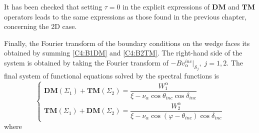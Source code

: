 It has been checked that setting $\tau=0$ in the explicit expressions of $\mathbf{DM}$ and $\mathbf{TM}$ operators leads to the same expressions as those found in the previous chapter, concerning the 2D case.

Finally, the Fourier transform of the boundary conditions on the wedge faces its obtained by summing \eqref{C4:B1DM} and \eqref{C4:B2TM}. The right-hand side of the system is obtained by taking the Fourier transform of $-Bv_{\alpha}^{inc}|_{\mathcal{S}_j}, \; j=1,2$. The final system of functional equations solved by the spectral functions is 
\begin{equation}
\left\{
\begin{matrix}
\textbf{DM}(\Sigma_1)+\textbf{TM}(\Sigma_2)=\dfrac{W_1^{\alpha}}{\xi-\nu_{\alpha} \cos \theta_{inc}\cos\delta_{inc}} 
\\
\textbf{TM}(\Sigma_1)+\textbf{DM}(\Sigma_2)=\dfrac{W_2^{\alpha}}{\xi-\nu_{\alpha}\cos(\varphi-\theta_{inc})\cos\delta_{inc}}
\end{matrix}
\right.
\label{C4:equationsintegrales}
\end{equation}
where
